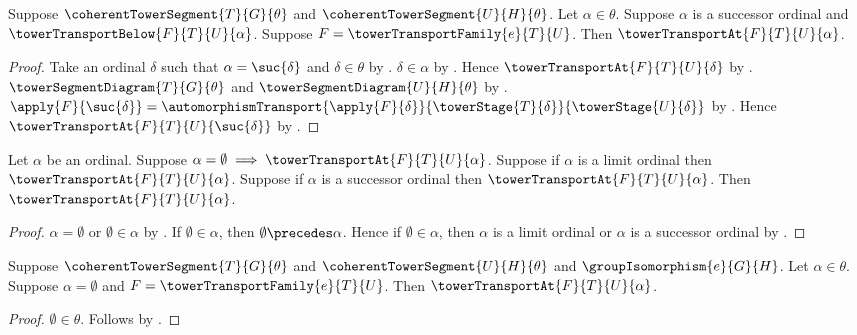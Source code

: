\begin{proposition}\label{tower_transport_successor_from_below}
    Suppose $\coherentTowerSegment{T}{G}{\theta}$ and
        $\coherentTowerSegment{U}{H}{\theta}$.
    Let $\alpha\in\theta$.
    Suppose $\alpha$ is a successor ordinal and
        $\towerTransportBelow{F}{T}{U}{\alpha}$.
    Suppose $F=\towerTransportFamily{e}{T}{U}$.
    Then $\towerTransportAt{F}{T}{U}{\alpha}$.
\end{proposition}
\begin{proof}
    Take an ordinal $\delta$ such that
        $\alpha=\suc{\delta}$ and $\delta\in\theta$ by
        .
    $\delta\in\alpha$ by .
    Hence $\towerTransportAt{F}{T}{U}{\delta}$ by
        .
    $\towerSegmentDiagram{T}{G}{\theta}$ and
        $\towerSegmentDiagram{U}{H}{\theta}$ by
        .
    $\apply{F}{\suc{\delta}}=
        \automorphismTransport{\apply{F}{\delta}}
            {\towerStage{T}{\delta}}{\towerStage{U}{\delta}}$ by
        .
    Hence $\towerTransportAt{F}{T}{U}{\suc{\delta}}$ by
        .
\end{proof}

\begin{proposition}\label{tower_transport_at_from_ordinal_cases}
    Let $\alpha$ be an ordinal.
    Suppose $\alpha=\emptyset\implies
        \towerTransportAt{F}{T}{U}{\alpha}$.
    Suppose if $\alpha$ is a limit ordinal then
        $\towerTransportAt{F}{T}{U}{\alpha}$.
    Suppose if $\alpha$ is a successor ordinal then
        $\towerTransportAt{F}{T}{U}{\alpha}$.
    Then $\towerTransportAt{F}{T}{U}{\alpha}$.
\end{proposition}
\begin{proof}
    $\alpha=\emptyset$ or $\emptyset\in\alpha$ by
        .
    If $\emptyset\in\alpha$, then $\emptyset\precedes\alpha$.
    Hence if $\emptyset\in\alpha$, then
        $\alpha$ is a limit ordinal or
        $\alpha$ is a successor ordinal by
        .
\end{proof}

\begin{proposition}\label{coherent_tower_transport_zero_case}
    Suppose $\coherentTowerSegment{T}{G}{\theta}$ and
        $\coherentTowerSegment{U}{H}{\theta}$ and
        $\groupIsomorphism{e}{G}{H}$.
    Let $\alpha\in\theta$.
    Suppose $\alpha=\emptyset$ and
        $F=\towerTransportFamily{e}{T}{U}$.
    Then $\towerTransportAt{F}{T}{U}{\alpha}$.
\end{proposition}
\begin{proof}
    $\emptyset\in\theta$.
    Follows by .
\end{proof}

